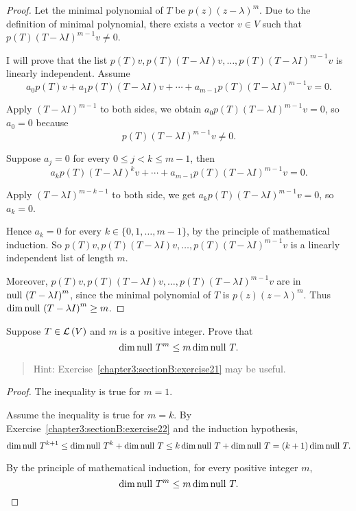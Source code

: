 \begin{proof}
    Let the minimal polynomial of $T$ be $p(z) {(z - \lambda)}^{m}$. Due to the definition of minimal polynomial, there exists a vector $v\in V$ such that $p(T){(T - \lambda I)}^{m-1}v\ne 0$.

    I will prove that the list $p(T)v, p(T){(T - \lambda I)}v, \ldots, p(T){(T - \lambda I)}^{m-1}v$ is linearly independent. Assume
    \[
        a_{0}p(T)v + a_{1}p(T){(T - \lambda I)}v + \cdots + a_{m-1}p(T){(T - \lambda I)}^{m-1}v = 0.
    \]

    Apply ${(T - \lambda I)}^{m-1}$ to both sides, we obtain $a_{0}p(T){(T - \lambda I)}^{m-1}v = 0$, so $a_{0} = 0$ because
    \[
        p(T){(T - \lambda I)}^{m-1}v\ne 0.
    \]

    Suppose $a_{j} = 0$ for every $0\leq j < k\leq m-1$, then
    \[
        a_{k}p(T){(T - \lambda I)}^{k}v + \cdots + a_{m-1}p(T){(T - \lambda I)}^{m-1}v = 0.
    \]

    Apply ${(T - \lambda I)}^{m-k-1}$ to both side, we get $a_{k}p(T){(T - \lambda I)}^{m-1}v = 0$, so $a_{k} = 0$.

    Hence $a_{k} = 0$ for every $k\in\{ 0, 1,\ldots, m-1 \}$, by the principle of mathematical induction. So $p(T)v, p(T)(T - \lambda I)v, \ldots, p(T){(T - \lambda I)}^{m-1}v$ is a linearly independent list of length $m$.

    Moreover, $p(T)v, p(T)(T - \lambda I)v, \ldots, p(T){(T - \lambda I)}^{m-1}v$ are in $\operatorname{null}\,{{(T - \lambda I)}^{m}}$, since the minimal polynomial of $T$ is $p(z){(z - \lambda)}^{m}$. Thus $\dim\operatorname{null}\,{{(T - \lambda I)}^{m}}\geq m$.
\end{proof}
\newpage

\begin{exercise}\label{chapter8:sectionA:exercise5}
    Suppose $T\in\mathcal{L}\left({V}\right)$ and $m$ is a positive integer. Prove that
    \[
        \dim\operatorname{null}\,{T^{m}}\leq m\dim\operatorname{null}\,{T}.
    \]
\end{exercise}

\begin{quote}
    Hint: Exercise~\ref{chapter3:sectionB:exercise21} may be useful.
\end{quote}

\begin{proof}
    The inequality is true for $m = 1$.

    Assume the inequality is true for $m = k$. By Exercise~\ref{chapter3:sectionB:exercise22} and the induction hypothesis,
    \[
        \dim\operatorname{null}\,{T^{k+1}} \leq \dim\operatorname{null}\,{T^{k}} + \dim\operatorname{null}\,{T} \leq k\dim\operatorname{null}\,{T} + \dim\operatorname{null}\,{T} = (k + 1)\dim\operatorname{null}\,{T}.
    \]

    By the principle of mathematical induction, for every positive integer $m$,
    \[
        \dim\operatorname{null}\,{T^{m}} \leq m\dim\operatorname{null}\,{T}.\qedhere
    \]
\end{proof}
\newpage


